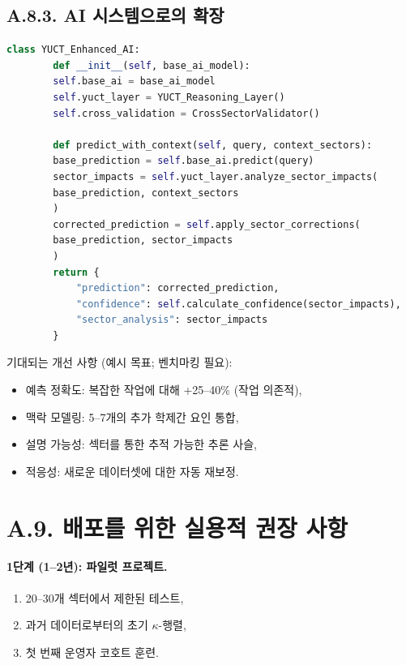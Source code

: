 \documentclass[13pt,a4paper]{article}
\begin{document}
	\subsection*{A.8.3. AI 시스템으로의 확장}
	
	\begin{lstlisting}[language=Python]
		class YUCT_Enhanced_AI:
		def __init__(self, base_ai_model):
		self.base_ai = base_ai_model
		self.yuct_layer = YUCT_Reasoning_Layer()
		self.cross_validation = CrossSectorValidator()
		
		def predict_with_context(self, query, context_sectors):
		base_prediction = self.base_ai.predict(query)
		sector_impacts = self.yuct_layer.analyze_sector_impacts(
		base_prediction, context_sectors
		)
		corrected_prediction = self.apply_sector_corrections(
		base_prediction, sector_impacts
		)
		return {
			"prediction": corrected_prediction,
			"confidence": self.calculate_confidence(sector_impacts),
			"sector_analysis": sector_impacts
		}
	\end{lstlisting}
	
	기대되는 개선 사항 (예시 목표; 벤치마킹 필요):
	\begin{itemize}[leftmargin=*]
		\item 예측 정확도: 복잡한 작업에 대해 +25--40\% (작업 의존적),
		\item 맥락 모델링: 5--7개의 추가 학제간 요인 통합,
		\item 설명 가능성: 섹터를 통한 추적 가능한 추론 사슬,
		\item 적응성: 새로운 데이터셋에 대한 자동 재보정.
	\end{itemize}
	
	\section*{A.9. 배포를 위한 실용적 권장 사항}
	
	\paragraph{1단계 (1--2년): 파일럿 프로젝트.}
	\begin{enumerate}[leftmargin=*]
		\item 20--30개 섹터에서 제한된 테스트,
		\item 과거 데이터로부터의 초기 $\kappa$-행렬,
		\item 첫 번째 운영자 코호트 훈련.
	\end{enumerate}
	
\end{document}
